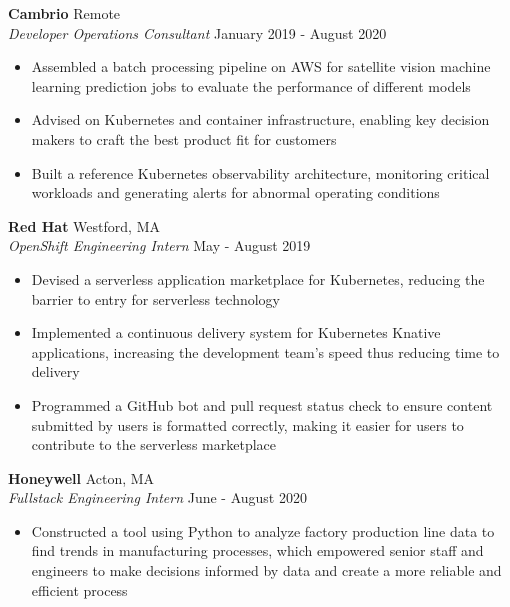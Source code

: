 \documentclass[10pt]{article}
\begin{document}
\begin{flushleft}
	\textbf{Cambrio} \hfill Remote \\
	\textit{Developer Operations Consultant} \hfill January 2019 - August 2020  \\
	\begin{itemize}
		\item Assembled a batch processing pipeline on AWS for satellite vision machine learning prediction jobs to evaluate the performance of different models

		\item Advised on Kubernetes and container infrastructure, enabling key decision makers to craft the best product fit for customers

		\item Built a reference Kubernetes observability architecture, monitoring critical workloads and generating alerts for abnormal operating conditions
	\end{itemize}

	 \textbf{Red Hat} \hfill Westford, MA \\
	 \textit{OpenShift Engineering Intern} \hfill May - August 2019 \\
	 \begin{itemize}
		 \item Devised a serverless application marketplace for Kubernetes, reducing the barrier to entry for serverless technology
		 
		 \item Implemented a continuous delivery system for Kubernetes Knative applications, increasing the development team's speed thus reducing time to delivery
 
		 \item Programmed a GitHub bot and pull request status check to ensure content submitted by users is formatted correctly, making it easier for users to contribute to the serverless marketplace
	 \end{itemize}

	\textbf{Honeywell} \hfill Acton, MA \\
	\textit{Fullstack Engineering Intern} \hfill June - August 2020 \\
    \begin{itemize}
        \item Constructed a tool using Python to analyze factory production line data to find trends in manufacturing processes, which empowered senior staff and engineers to make decisions informed by data and create a more reliable and efficient process


\end{itemize}
\end{flushleft}
\end{document}
